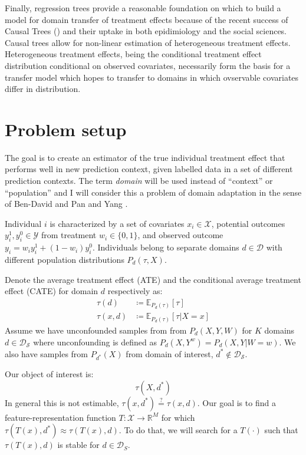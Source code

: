 \documentclass[a4paper,12pt]{article}
\theoremstyle{proposition}
\begin{document}
Finally, regression trees provide a reasonable foundation on which to build a model for domain transfer of treatment effects because of the recent success of Causal Trees (\cite{Athey2016}) and their uptake in both epidimiology and the social sciences. Causal trees allow for non-linear estimation of heterogeneous treatment effects. Heterogeneous treatment effects, being the conditional treatment effect distribution conditional on observed covariates, necessarily form the basis for a transfer model which hopes to transfer to domains in which ovservable covariates differ in distribution.

\section{Problem setup}

The goal is to create an estimator of the true individual treatment effect that performs well in new prediction context, given labelled data in a set of different prediction contexts. The term \textit{domain} will be used instead of ``context'' or ``population'' and I will consider this a problem of domain adaptation in the sense of Ben-David \parencite*{Ben-David2006} and Pan and Yang \parencite*{Pan2010}.

Individual $i$ is characterized by a set of covariates $x_i \in \mathcal{X}$, potential outcomes $y^1_i, y^0_i \in \mathcal{Y}$ from treatment $w_i \in \{0,1\}$, and observed outcome $y_i = w_iy^1_i + (1-w_i)y^0_i$. Individuals belong to separate domains $d \in \mathcal{D}$ with different population distributions $P_d(\tau, X)$.

Denote the average treatment effect (ATE) and the conditional average treatment effect (CATE) for domain $d$ respectively as:
%
\begin{align*}
\tau(d) &\coloneqq \mathbb{E}_{P_d(\tau)}[\tau] \\
\tau(x, d) &\coloneqq \mathbb{E}_{P_d(\tau)}[\tau | X=x]
\end{align*}
%
Assume we have unconfounded samples from from $P_d(X, Y, W)$ for $K$ domains $d \in \mathcal{D_S}$ where unconfounding is defined as $P_d(X, Y^w) = P_d(X, Y | W = w)$. We also have samples from $P_{d^*}(X)$ from domain of interest, $d^* \notin \mathcal{D_S}$.

Our object of interest is:
$$
\tau(X, d^*)
$$
%
In general this is not estimable, $\tau(x, d^*) \stackrel{?}{=} \tau(x, d)$. Our goal is to find a feature-representation function $T: \mathcal{X} \rightarrow \mathbb{R}^M$ for which $\tau(T(x), d^*) \approx \tau(T(x), d)$. To do that, we will search for a $T(\cdot)$ such that $\tau(T(x), d)$ is stable for $d \in \mathcal{D}_S$.
\end{document}
